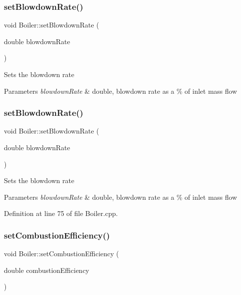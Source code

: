 \subsubsection{\texorpdfstring{set\+Blowdown\+Rate()}{setBlowdownRate()}\hspace{0.1cm}{\footnotesize\ttfamily [2/3]}}
{\footnotesize\ttfamily void Boiler\+::set\+Blowdown\+Rate (\begin{DoxyParamCaption}\item[{double}]{blowdown\+Rate }\end{DoxyParamCaption})}

Sets the blowdown rate 
\begin{DoxyParams}{Parameters}
{\em blowdown\+Rate} & double, blowdown rate as a \% of inlet mass flow \\
\hline
\end{DoxyParams}
\mbox{\label{class_boiler_a66c0e4c577dbd3f52dcf202e69a08371}} 
\subsubsection{\texorpdfstring{set\+Blowdown\+Rate()}{setBlowdownRate()}\hspace{0.1cm}{\footnotesize\ttfamily [3/3]}}
{\footnotesize\ttfamily void Boiler\+::set\+Blowdown\+Rate (\begin{DoxyParamCaption}\item[{double}]{blowdown\+Rate }\end{DoxyParamCaption})}

Sets the blowdown rate 
\begin{DoxyParams}{Parameters}
{\em blowdown\+Rate} & double, blowdown rate as a \% of inlet mass flow \\
\hline
\end{DoxyParams}


Definition at line 75 of file Boiler.\+cpp.

\mbox{\label{class_boiler_abef6bc48101f98f0650cb07fb1d51f74}} 
\subsubsection{\texorpdfstring{set\+Combustion\+Efficiency()}{setCombustionEfficiency()}\hspace{0.1cm}{\footnotesize\ttfamily [1/3]}}
{\footnotesize\ttfamily void Boiler\+::set\+Combustion\+Efficiency (\begin{DoxyParamCaption}\item[{double}]{combustion\+Efficiency }\end{DoxyParamCaption})}


